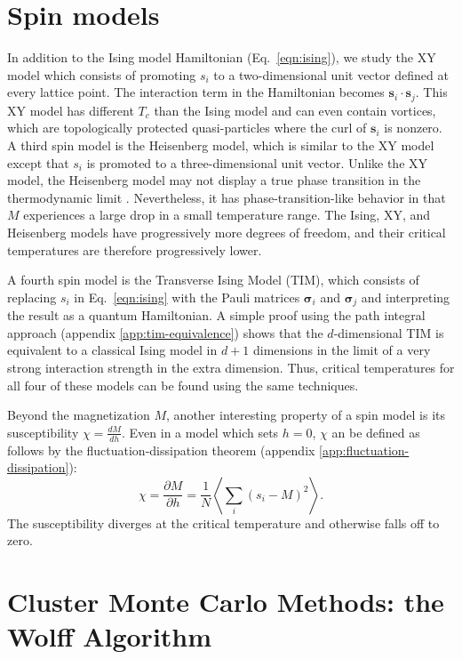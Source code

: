 \documentclass[amsmath,amssymb,aps,twocolumn,nofootinbib]{revtex4-2}
\newcommand{\braket}[1]{\left \langle #1 \right \rangle}
\begin{document}
\section{Spin models}
\label{sec:spin-models}

In addition to the Ising model Hamiltonian (Eq.~\ref{eqn:ising}), we study the XY model which consists of promoting $s_i$ to a two-dimensional unit vector defined at every lattice point. The interaction term in the Hamiltonian becomes $\bm s_i \cdot \bm s_j$. This XY model has different $T_c$ than the Ising model and can even contain vortices, which are topologically protected quasi-particles where the curl of $\bm s_i$ is nonzero. A third spin model is the Heisenberg model, which is similar to the XY model except that $s_i$ is promoted to a three-dimensional unit vector. Unlike the XY model, the Heisenberg model may not display a true phase transition in the thermodynamic limit \cite{tomita2014finite}. Nevertheless, it has phase-transition-like behavior in that $M$ experiences a large drop in a small temperature range. The Ising, XY, and Heisenberg models have progressively more degrees of freedom, and their critical temperatures are therefore progressively lower.

A fourth spin model is the Transverse Ising Model (TIM), which consists of replacing $s_i$ in Eq.~\ref{eqn:ising} with the Pauli matrices $\bm \sigma_i$ and $\bm \sigma_j$ and interpreting the result as a quantum Hamiltonian. A simple proof using the path integral approach (appendix \ref{app:tim-equivalence}) shows that the $d$-dimensional TIM is equivalent to a classical Ising model in $d+1$ dimensions in the limit of a very strong interaction strength in the extra dimension. Thus, critical temperatures for all four of these models can be found using the same techniques.

Beyond the magnetization $M$, another interesting property of a spin model is its susceptibility $\chi = \frac{dM}{dh}$. Even in a model which sets $h=0$, $\chi$ an be defined as follows by the fluctuation-dissipation theorem (appendix \ref{app:fluctuation-dissipation}):
\begin{equation}
  \chi = \frac{\partial M}{\partial h} = \frac{1}{N}\braket{\sum_i(s_i - M)^2}.
\end{equation}
The susceptibility diverges at the critical temperature and otherwise falls off to zero.


\section{Cluster Monte Carlo Methods: the Wolff Algorithm}
\label{sec:wolff}
\end{document}
